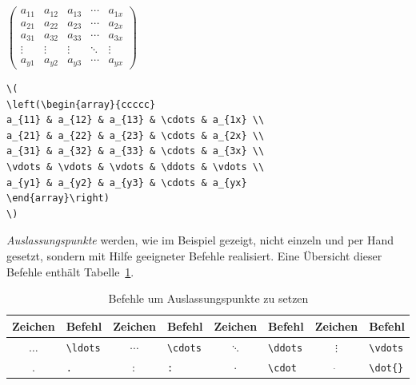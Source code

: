 \documentclass[a4paper,10pt,twoside]{scrbook}
\begin{document}
{\begin{minipage}[c]{.38\textwidth}
\setlength{\parskip}{1em}
\centering
\(
\left(\begin{array}{ccccc}
a_{11} & a_{12} & a_{13} & \cdots & a_{1x} \\ 
a_{21} & a_{22} & a_{23} & \cdots & a_{2x} \\ 
a_{31} & a_{32} & a_{33} & \cdots & a_{3x} \\ 
\vdots & \vdots & \vdots & \ddots & \vdots \\
a_{y1} & a_{y2} & a_{y3} & \cdots & a_{yx}
\end{array}\right)
\)
\end{minipage}
\hfill
\begin{minipage}[c]{.6\textwidth}
\setlength{\parskip}{1em}
\begin{lstlisting}[label=arraybeispiel, style=customlatex]
\(
\left(\begin{array}{ccccc}
a_{11} & a_{12} & a_{13} & \cdots & a_{1x} \\ 
a_{21} & a_{22} & a_{23} & \cdots & a_{2x} \\ 
a_{31} & a_{32} & a_{33} & \cdots & a_{3x} \\ 
\vdots & \vdots & \vdots & \ddots & \vdots \\
a_{y1} & a_{y2} & a_{y3} & \cdots & a_{yx}
\end{array}\right)
\)
\end{lstlisting}
\end{minipage}

\textsl{Auslassungspunkte} werden, wie im Beispiel gezeigt, 
nicht einzeln und per Hand gesetzt, sondern mit Hilfe geeigneter Befehle realisiert.
Eine Übersicht dieser Befehle enthält Tabelle~\ref{Tabelle_Befehle}.


\begin{table}[h!tb]
\centering
\caption{Befehle um Auslassungspunkte zu setzen}
\label{Tabelle_Befehle}       %
\begin{tabular}{clclclcl}
\hline
Zeichen & Befehl & Zeichen & Befehl & Zeichen & Befehl & Zeichen & Befehl \\
\hline
$\ldots$ & \texttt{\textbackslash ldots} & 
$\cdots$ & \texttt{\textbackslash cdots} &
$\ddots$ & \texttt{\textbackslash ddots} &
$\vdots$ & \texttt{\textbackslash vdots} \\
$.$ & \texttt{.} &
$:$ & \texttt{:} &
$\cdot$ & \texttt{\textbackslash cdot} &
$\dot{}$ & \texttt{\textbackslash dot\{\}} \\
\hline
\end{tabular}
\end{table}

}
\end{document}

